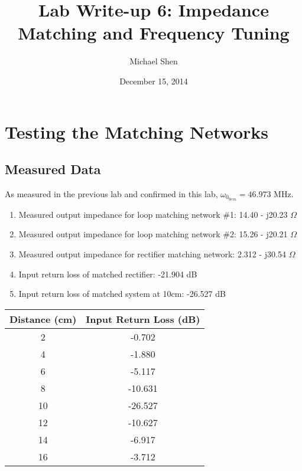 \documentclass{article}
\begin{document}
\title{Lab Write-up 6: Impedance Matching and Frequency Tuning}
\author{Michael Shen}
\date{December 15, 2014}
\maketitle


\section{Testing the Matching Networks}

\subsection{Measured Data}
As measured in the previous lab and confirmed in this lab, $\omega_{0_{9cm}} = 46.973$ MHz.

\begin{enumerate}
	\item Measured output impedance for loop matching network \#1: 14.40 - j20.23 $\Omega$
	\item Measured output impedance for loop matching network \#2: 15.26 - j20.21 $\Omega$
	\item Measured output impedance for rectifier matching network: 2.312 - j30.54 $\Omega$
	\item Input return loss of matched rectifier: -21.904 dB
	\item Input return loss of matched system at 10cm: -26.527 dB
\end{enumerate}

\begin{table}[h]
\centering
\begin{tabular}{|c|c|}
\hline
Distance (cm) & Input Return Loss (dB) \\ \hline
2             & -0.702                 \\ \hline
4             & -1.880                 \\ \hline
6             & -5.117                 \\ \hline
8             & -10.631                \\ \hline
10            & -26.527                \\ \hline
12            & -10.627                \\ \hline
14            & -6.917                 \\ \hline
16            & -3.712                 \\ \hline
\end{tabular}
\end{table}
\end{document}
